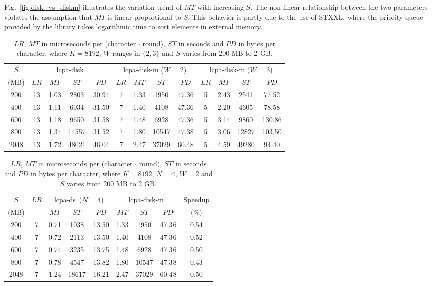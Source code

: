 \documentclass[10pt,journal,compsoc]{IEEEtran}
\begin{document}
\begin{CJK*}{GBK}{song}
Fig.~\ref{fig:disk_vs_diskm} illustrates the variation trend of $MT$ with increasing $S$. The non-linear relationship between the two parameters violates the assumption that $MT$ is linear proportional to $S$. This behavior is partly due to the use of STXXL, where the priority queue provided by the library takes logarithmic time to sort elements in external memory.

\begin{table}[htbp!]
\caption{$LR$, $MT$ in microseconds per (character $\cdot$ round), $ST$ in seconds and $PD$ in bytes per character, where $K=8192$, $W$ ranges in $\{2,3\}$ and $S$ varies from 200 MB to 2 GB.}
\label{tbl:disk_vs_diskm}
\centering
\begin{tabular}{|c|c|c|c|c|c|c|c|c|c|c|c|c|}
\hline
$S$ & \multicolumn{4}{c|}{lcpa-disk} & \multicolumn{4}{c|}{lcpa-disk-m ($W = 2$)} & \multicolumn{4}{c|}{lcpa-disk-m ($W = 3$)}\\
\cline{2-13}
(MB) & $LR$ & $MT$ & $ST$ & $PD$ & $LR$ & $MT$ & $ST$ & $PD$ & $LR$ & $MT$ & $ST$ & $PD$\\
\hline
200 & 13 & 1.03 & 2803 & 30.94 & 7 & 1.33 & 1950 & 47.36 & 5 & 2.43 & 2541 & 77.52\\
\hline
400 & 13 & 1.11 & 6034 & 31.50 & 7 & 1.40 & 4108 & 47.36 & 5 & 2.20 & 4605 & 78.58\\
\hline
600 & 13 & 1.18 & 9650 & 31.58 & 7 & 1.48 & 6928 & 47.36 & 5 & 3.14 & 9860 & 130.86\\
\hline
800 & 13 & 1.34 & 14557 & 31.52 & 7 & 1.80 & 10547 & 47.38 & 5 & 3.06 & 12827 & 103.50\\
\hline
2048 & 13 & 1.72 & 48021 & 46.04 & 7 & 2.47 & 37029 & 60.48 & 5 & 4.59 & 49280 & 94.40\\
\hline
\end{tabular}
\centering
\end{table}

\begin{table}[htbp!]
\caption{$LR$, $MT$ in microseconds per (character $\cdot$ round), $ST$ in seconds and $PD$ in bytes per character, where $K=8192$, $N=4$, $W=2$ and $S$ varies from 200 MB to 2 GB.}
\label{tbl:diskm_vs_ds}
\centering
\begin{tabular}{|c|c|c|c|c|c|c|c|c|}
\hline
$S$ & $LR$ & \multicolumn{3}{c|}{lcpa-ds~($N=4$)} & \multicolumn{3}{c|}{lcpa-disk-m} & Speedup\\
\cline{3-8}
(MB) & & $MT$ & $ST$ & $PD$ & $MT$ & $ST$ & $PD$ & (\%)\\
\hline
200 & 7 & 0.71 & 1038 & 13.50 & 1.33 & 1950 & 47.36 & 0.54 \\
\hline
400 & 7 & 0.72 & 2113 & 13.50 & 1.40 & 4108 & 47.36 & 0.52 \\
\hline
600 & 7 & 0.74 & 3235 & 13.75 & 1.48 & 6928 & 47.36 & 0.50 \\
\hline
800 & 7 & 0.78 & 4547 & 13.82 & 1.80 & 10547 & 47.38 & 0.43 \\
\hline
2048 & 7 & 1.24 & 18617 & 16.21 & 2.47 & 37029 & 60.48 & 0.50 \\
\hline
\end{tabular}
\centering
\end{table}


\end{CJK*}
\end{document}
